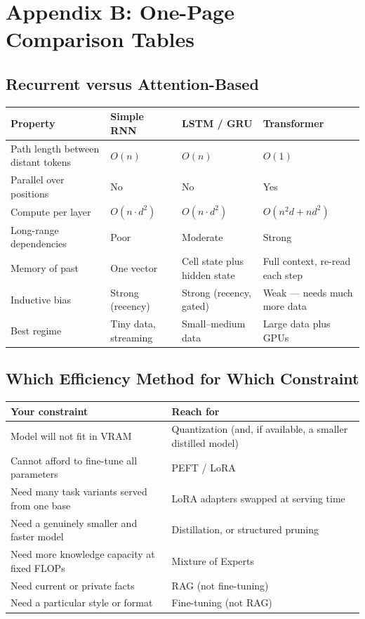 \documentclass[11pt,a4paper]{article}
\begin{document}
\section{Appendix B: One-Page Comparison Tables}

\subsection{Recurrent versus Attention-Based}

\begin{center}
\begin{tabularx}{\textwidth}{lYYY}
\textbf{Property} & \textbf{Simple RNN} & \textbf{LSTM / GRU} & \textbf{Transformer} \\
\hline
Path length between distant tokens & $O(n)$ & $O(n)$ & $O(1)$ \\
Parallel over positions & No & No & Yes \\
Compute per layer & $O(n \cdot d^2)$ & $O(n \cdot d^2)$ & $O(n^2 d + n d^2)$ \\
Long-range dependencies & Poor & Moderate & Strong \\
Memory of past & One vector & Cell state plus hidden state & Full context, re-read each step \\
Inductive bias & Strong (recency) & Strong (recency, gated) & Weak --- needs much more data \\
Best regime & Tiny data, streaming & Small--medium data & Large data plus GPUs \\
\end{tabularx}
\end{center}

\subsection{Which Efficiency Method for Which Constraint}

\begin{center}
\begin{tabularx}{\textwidth}{lY}
\textbf{Your constraint} & \textbf{Reach for} \\
\hline
Model will not fit in VRAM & Quantization (and, if available, a smaller distilled model) \\
Cannot afford to fine-tune all parameters & PEFT / LoRA \\
Need many task variants served from one base & LoRA adapters swapped at serving time \\
Need a genuinely smaller and faster model & Distillation, or structured pruning \\
Need more knowledge capacity at fixed FLOPs & Mixture of Experts \\
Need current or private facts & RAG (not fine-tuning) \\
Need a particular style or format & Fine-tuning (not RAG) \\
\end{tabularx}
\end{center}
\end{document}
